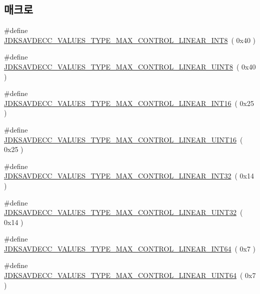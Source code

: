\subsection*{매크로}
\begin{DoxyCompactItemize}
\item 
\#define \hyperlink{group__values__type__max_ga6120a116ad0670358d58d7a277f4be0b}{J\+D\+K\+S\+A\+V\+D\+E\+C\+C\+\_\+\+V\+A\+L\+U\+E\+S\+\_\+\+T\+Y\+P\+E\+\_\+\+M\+A\+X\+\_\+\+C\+O\+N\+T\+R\+O\+L\+\_\+\+L\+I\+N\+E\+A\+R\+\_\+\+I\+N\+T8}~( 0x40 )
\item 
\#define \hyperlink{group__values__type__max_ga282048637cd6a0ac5d4f6ebeb43e1990}{J\+D\+K\+S\+A\+V\+D\+E\+C\+C\+\_\+\+V\+A\+L\+U\+E\+S\+\_\+\+T\+Y\+P\+E\+\_\+\+M\+A\+X\+\_\+\+C\+O\+N\+T\+R\+O\+L\+\_\+\+L\+I\+N\+E\+A\+R\+\_\+\+U\+I\+N\+T8}~( 0x40 )
\item 
\#define \hyperlink{group__values__type__max_ga507f77ae464fd52f11d7774346a78aca}{J\+D\+K\+S\+A\+V\+D\+E\+C\+C\+\_\+\+V\+A\+L\+U\+E\+S\+\_\+\+T\+Y\+P\+E\+\_\+\+M\+A\+X\+\_\+\+C\+O\+N\+T\+R\+O\+L\+\_\+\+L\+I\+N\+E\+A\+R\+\_\+\+I\+N\+T16}~( 0x25 )
\item 
\#define \hyperlink{group__values__type__max_ga25f99cfacdf33953ae9fc93eb77f0910}{J\+D\+K\+S\+A\+V\+D\+E\+C\+C\+\_\+\+V\+A\+L\+U\+E\+S\+\_\+\+T\+Y\+P\+E\+\_\+\+M\+A\+X\+\_\+\+C\+O\+N\+T\+R\+O\+L\+\_\+\+L\+I\+N\+E\+A\+R\+\_\+\+U\+I\+N\+T16}~( 0x25 )
\item 
\#define \hyperlink{group__values__type__max_ga9bf75daa6ebe669142ea9a4936295a10}{J\+D\+K\+S\+A\+V\+D\+E\+C\+C\+\_\+\+V\+A\+L\+U\+E\+S\+\_\+\+T\+Y\+P\+E\+\_\+\+M\+A\+X\+\_\+\+C\+O\+N\+T\+R\+O\+L\+\_\+\+L\+I\+N\+E\+A\+R\+\_\+\+I\+N\+T32}~( 0x14 )
\item 
\#define \hyperlink{group__values__type__max_gaf1d160791f032eef631a6f503c66e406}{J\+D\+K\+S\+A\+V\+D\+E\+C\+C\+\_\+\+V\+A\+L\+U\+E\+S\+\_\+\+T\+Y\+P\+E\+\_\+\+M\+A\+X\+\_\+\+C\+O\+N\+T\+R\+O\+L\+\_\+\+L\+I\+N\+E\+A\+R\+\_\+\+U\+I\+N\+T32}~( 0x14 )
\item 
\#define \hyperlink{group__values__type__max_ga97cee74e7657b9cf4d08001045c25af7}{J\+D\+K\+S\+A\+V\+D\+E\+C\+C\+\_\+\+V\+A\+L\+U\+E\+S\+\_\+\+T\+Y\+P\+E\+\_\+\+M\+A\+X\+\_\+\+C\+O\+N\+T\+R\+O\+L\+\_\+\+L\+I\+N\+E\+A\+R\+\_\+\+I\+N\+T64}~( 0x7 )
\item 
\#define \hyperlink{group__values__type__max_gac48f6bef9820e607d28da85d970b11d5}{J\+D\+K\+S\+A\+V\+D\+E\+C\+C\+\_\+\+V\+A\+L\+U\+E\+S\+\_\+\+T\+Y\+P\+E\+\_\+\+M\+A\+X\+\_\+\+C\+O\+N\+T\+R\+O\+L\+\_\+\+L\+I\+N\+E\+A\+R\+\_\+\+U\+I\+N\+T64}~( 0x7 )
\item 

\end{DoxyCompactItemize}
